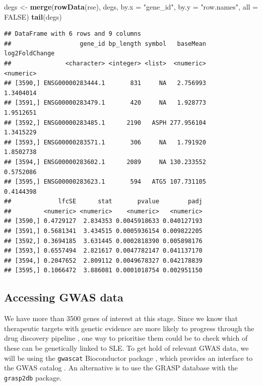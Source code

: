 \documentclass[9pt,a4paper,]{extarticle}
\newenvironment{Shaded}{\begin{snugshade}}{\end{snugshade}}
\newcommand{\KeywordTok}[1]{\textcolor[rgb]{0.13,0.29,0.53}{\textbf{#1}}}
\newcommand{\DataTypeTok}[1]{\textcolor[rgb]{0.13,0.29,0.53}{#1}}
\newcommand{\StringTok}[1]{\textcolor[rgb]{0.31,0.60,0.02}{#1}}
\newcommand{\OtherTok}[1]{\textcolor[rgb]{0.56,0.35,0.01}{#1}}
\newcommand{\NormalTok}[1]{#1}
\begin{document}
\begin{Shaded}
\begin{Highlighting}[]
\NormalTok{degs <-}\StringTok{ }\KeywordTok{merge}\NormalTok{(}\KeywordTok{rowData}\NormalTok{(rse), degs, }\DataTypeTok{by.x =} \StringTok{"gene_id"}\NormalTok{, }\DataTypeTok{by.y =} \StringTok{"row.names"}\NormalTok{, }\DataTypeTok{all =} \OtherTok{FALSE}\NormalTok{)}
\KeywordTok{tail}\NormalTok{(degs)}
\end{Highlighting}
\end{Shaded}

\begin{verbatim}
## DataFrame with 6 rows and 9 columns
##                   gene_id bp_length symbol   baseMean log2FoldChange
##               <character> <integer> <list>  <numeric>      <numeric>
## [3590,] ENSG00000283444.1       831     NA   2.756993      1.3404014
## [3591,] ENSG00000283479.1       420     NA   1.928773      1.9512651
## [3592,] ENSG00000283485.1      2190   ASPH 277.956104      1.3415229
## [3593,] ENSG00000283571.1       306     NA   1.791920      1.8502738
## [3594,] ENSG00000283602.1      2089     NA 130.233552      0.5752086
## [3595,] ENSG00000283623.1       594   ATG5 107.731105      0.4144398
##             lfcSE      stat       pvalue        padj
##         <numeric> <numeric>    <numeric>   <numeric>
## [3590,] 0.4729127  2.834353 0.0045918633 0.040127193
## [3591,] 0.5681341  3.434515 0.0005936154 0.009822205
## [3592,] 0.3694185  3.631445 0.0002818390 0.005898176
## [3593,] 0.6557494  2.821617 0.0047782147 0.041137170
## [3594,] 0.2047652  2.809112 0.0049678327 0.042178839
## [3595,] 0.1066472  3.886081 0.0001018754 0.002951150
\end{verbatim}

\subsection{Accessing GWAS data}\label{accessing-gwas-data}

We have more than 3500 genes of interest at this stage.
Since we know that therapeutic targets with genetic evidence are more likely to progress through the drug discovery pipeline \citep{Nelson2015}, one way to prioritise them could be to check which of these can be genetically linked to SLE.
To get hold of relevant GWAS data, we will be using the \texttt{gwascat} Bioconductor package \citep{Carey2017a}, which provides an interface to the GWAS catalog \citep{MacArthur2017}.
An alternative is to use the GRASP \citep{Eicher2015} database with the \texttt{grasp2db} \citep{Carey2017b} package.
\end{document}
